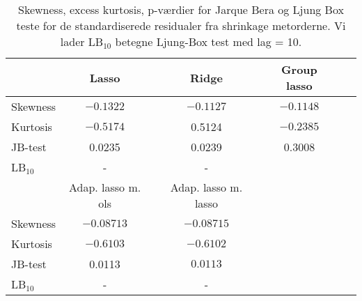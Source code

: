 \begin{table}
\center
\begin{tabular}{lrrrrrrrrrr} 
\toprule
& \multicolumn{2}{c}{Lasso} && \multicolumn{2}{c}{Ridge } && \multicolumn{2}{c}{Group lasso} \\ \midrule
Skewness & \multicolumn{2}{c}{$-0.1322$} &&\multicolumn{2}{c}{$-0.1127$} && \multicolumn{2}{c}{$-0.1148$} \\
Kurtosis & \multicolumn{2}{c}{$-0.5174$} && \multicolumn{2}{c}{0.5124} &&\multicolumn{2}{c}{$-0.2385$} \\
JB-test & \multicolumn{2}{c}{0.0235} && \multicolumn{2}{c}{0.0239} && \multicolumn{2}{c}{0.3008}  \\
LB$_{10}$ &  \multicolumn{2}{c}{-} &&  \multicolumn{2}{c}{-} &&  \multicolumn{2}{c}{} \\  \bottomrule \toprule
 & \multicolumn{2}{c}{Adap. lasso m. ols}  && \multicolumn{2}{c}{Adap. lasso m. lasso} \\ \midrule
Skewness &  \multicolumn{2}{c}{$-0.08713$} && \multicolumn{2}{c}{$-0.08715$} \\
Kurtosis & \multicolumn{2}{c}{$-0.6103$} && \multicolumn{2}{c}{$-0.6102$} \\
JB-test &  \multicolumn{2}{c}{0.0113} &&  \multicolumn{2}{c}{$0.0113$} \\ 
LB$_{10}$ &   \multicolumn{2}{c}{-} &&  \multicolumn{2}{c}{-} \\ \bottomrule
 \end{tabular}
\caption{Skewness, excess kurtosis, p-værdier for Jarque Bera og Ljung Box teste for de standardiserede residualer fra shrinkage metorderne. Vi lader LB$_{10}$ betegne Ljung-Box test med lag = 10. } \label{tab:res_shrinkage_tab}
\end{table}